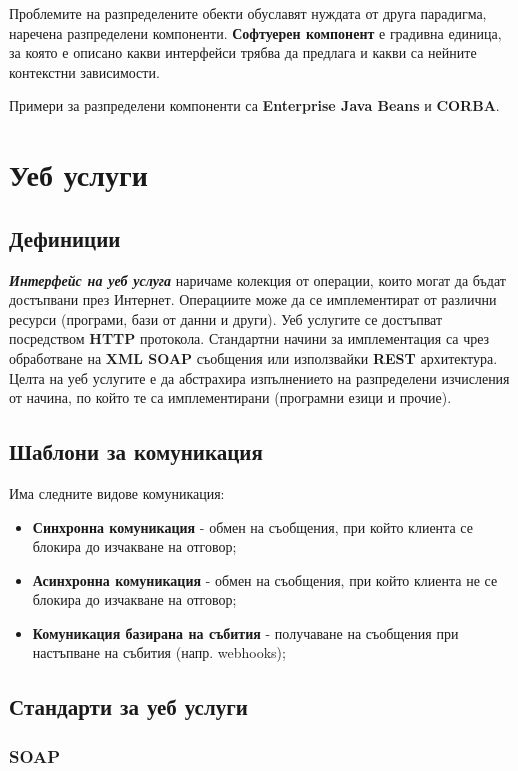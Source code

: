 \documentclass[fleqn,12pt]{article}
\begin{document}
Проблемите на разпределените обекти обуславят нуждата от друга парадигма, наречена разпределени компоненти.
\textbf{Софтуерен компонент} е градивна единица, за която е описано какви интерфейси трябва да предлага и какви са нейните контекстни зависимости.
\bigbreak

Примери за разпределени компоненти са \textbf{Enterprise Java Beans} и \textbf{CORBA}. 


\section{Уеб услуги}
\subsection{Дефиниции}

\textbf{\textit{Интерфейс на уеб услуга}} наричаме колекция от операции, които могат да бъдат достъпвани през Интернет.
Операциите може да се имплементират от различни ресурси (програми, бази от данни и други).
Уеб услугите се достъпват посредством \textbf{HTTP} протокола.
Стандартни начини за имплементация са чрез обработване на \textbf{XML SOAP} съобщения или използвайки \textbf{REST} архитектура.
Целта на уеб услугите е да абстрахира изпълнението на разпределени изчисления от начина, по който те са имплементирани (програмни езици и прочие).

\subsection{Шаблони за комуникация}

Има следните видове комуникация:
\begin{itemize}
    \item \textbf{Синхронна комуникация} - обмен на съобщения, при който клиента се блокира до изчакване на отговор;
    \item \textbf{Асинхронна комуникация} - обмен на съобщения, при който клиента не се блокира до изчакване на отговор;
    \item \textbf{Комуникация базирана на събития} - получаване на съобщения при настъпване на събития (напр. webhooks);
\end{itemize}

\subsection{Стандарти за уеб услуги}
\subsubsection{SOAP}
\end{document}
